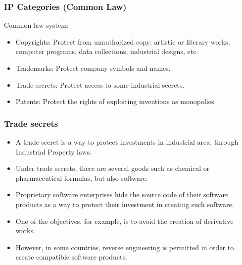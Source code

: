
\begin{frame}
\frametitle{IP Categories (Common Law)}

\alert{Common law} system:
\begin{itemize}
\item \alert{Copyrights}: Protect from unauthorized copy: artistic or literary
  works, computer programs, data collections, industrial designs, etc.
\item \alert{Trademarks}: Protect company symbols and names.
\item \alert{Trade secrets}: Protect access to some industrial secrets.
\item \alert{Patents}: Protect the rights of exploiting inventions as monopolies.
\end{itemize}

\end{frame}




\begin{frame}
\frametitle{Trade secrets}

\begin{itemize}
\item A trade secret is a way to protect investments in industrial area,
through Industrial Property laws.

\item Under trade secrets, there are several goods such as chemical or pharmaceutical
formulas, but also software.

\item Proprietary software enterprises hide the source code of their
software products as a way to protect their investment in creating
such software.

\item One of the objectives, for example, is to avoid the creation of
derivative works.

\item However, in some countries, reverse engineering is permitted in order to create
compatible software products.
\end{itemize}

\end{frame}


